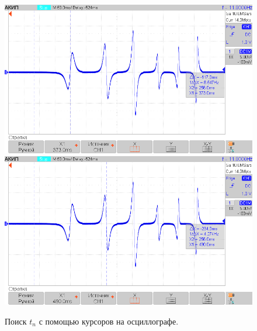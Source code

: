 \documentclass[12pt]{article}
\begin{document}
\begin{figure}[h]
\caption{ Поиск $t_n$ с помощью курсоров на осциллографе.}
\centering
\includegraphics[scale=0.5]{AKIP0002.png}
\includegraphics[scale=0.5]{AKIP0003.png}
\end{figure}
\end{document}
